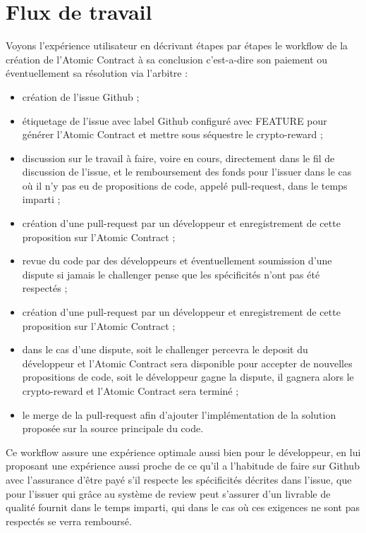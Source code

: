 \documentclass[
	a4paper, %
	10pt, %
	unnumberedsections, %
	twoside, %
]{LTJournalArticle}
\begin{document}

\section{Flux de travail}

Voyons l’expérience utilisateur en décrivant étapes par étapes le workflow de la création de l’Atomic Contract à sa conclusion c’est-a-dire son paiement ou éventuellement sa résolution via l’arbitre :

\begin{itemize}
    \item création de l’issue Github ;
    \item étiquetage de l’issue avec label Github configuré avec FEATURE pour générer l’Atomic Contract et mettre sous séquestre le crypto-reward ;
    \item discussion sur le travail à faire, voire en cours, directement dans le fil de discussion de l’issue, et le remboursement des fonds pour l’issuer dans le cas où il n’y pas eu de propositions de code, appelé pull-request, dans le temps imparti ;
    \item création d’une pull-request par un développeur  et enregistrement de cette proposition sur l’Atomic Contract ;
    \item revue du code par des développeurs et éventuellement soumission d’une dispute si jamais le challenger pense que les spécificités n’ont pas été respectés ;
    \item création d’une pull-request par un développeur et enregistrement de cette proposition sur l’Atomic Contract ;
    \item dans le cas d’une dispute, soit le challenger percevra le deposit du développeur et l’Atomic Contract sera disponible pour accepter de nouvelles propositions de code, soit le développeur gagne la dispute, il gagnera alors le crypto-reward et l’Atomic Contract sera terminé ;
    \item le merge de la pull-request afin d’ajouter l’implémentation de la solution proposée sur la source principale du code.
\end{itemize}

Ce workflow assure une expérience optimale aussi bien pour le développeur, en lui proposant une expérience aussi proche de ce qu’il a l'habitude de faire sur Github avec l’assurance d'être payé s’il respecte les spécificités décrites dans l’issue, que pour l’issuer qui grâce au système de review peut s’assurer d’un livrable de qualité fournit dans le temps imparti, qui dans le cas où ces exigences ne sont pas respectés se verra remboursé.
\end{document}
